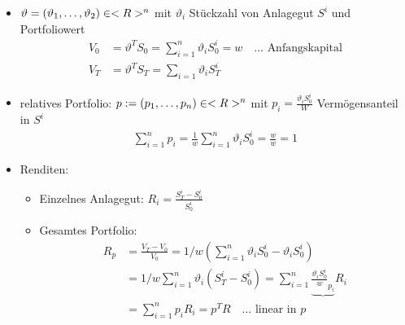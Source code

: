 \begin{*remark}
	\begin{itemize}
		\item $\vartheta = (\vartheta_1, \dots, \vartheta_2) \in <R>^n$ mit $\vartheta_i$ Stückzahl von Anlagegut $S^i$ und Portfoliowert
		\begin{align*}
			V_0 &= \vartheta^T S_0 = \sum_{i=1}^n \vartheta_i S_0^i = w \quad \dots \text{ Anfangskapital}\\
			V_T &= \vartheta^T S_T = \sum_{i=1}\vartheta_i S_T^i
		\end{align*}
		\item relatives Portfolio: $p := (p_1, \dots, p_n) \in <R>^n$ mit $p_i = \frac{\vartheta_i S_0^i}{W}$ Vermögensanteil in $S^i$
		\begin{align*}
			\sum_{i=1}^n p_i = \frac1w\sum_{i=1}^n \vartheta_i S_0^i = \frac w w = 1
		\end{align*}
		\item Renditen: 
		\begin{itemize}
			\item Einzelnes Anlagegut: $R_i = \frac{S_T^i - S_0^i}{S_0^i}$
			\item Gesamtes Portfolio: 
			\begin{align*}
				R_p &= \frac{V_T - V_0}{V_0} = 1/w (\sum_{i=1}^n \vartheta_i S_0^i - \vartheta_i S_0^i)\\
				&= 1/w \sum_{i=1}^n \vartheta_i(S_T^i - S_0^i) = \sum_{i=1}^n \underbrace{\frac{\vartheta_i S_0^i}{w}_{p_i}}R_i\\
				&= \sum_{i=1}^n p_i R_i = p^T R \quad \dots \text{ linear in }p
			\end{align*}
		\end{itemize}
	\end{itemize}
\end{*remark}